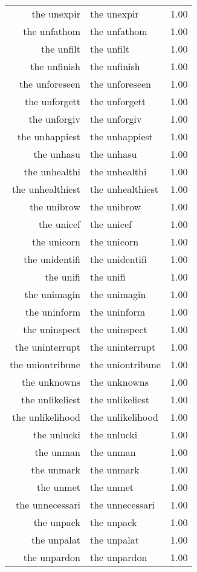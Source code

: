 \begin{table}[ht]
\begin{tabular}{rlr}
  the unexpir & the unexpir & 1.00 \\ 
  the unfathom & the unfathom & 1.00 \\ 
  the unfilt & the unfilt & 1.00 \\ 
  the unfinish & the unfinish & 1.00 \\ 
  the unforeseen & the unforeseen & 1.00 \\ 
  the unforgett & the unforgett & 1.00 \\ 
  the unforgiv & the unforgiv & 1.00 \\ 
  the unhappiest & the unhappiest & 1.00 \\ 
  the unhasu & the unhasu & 1.00 \\ 
  the unhealthi & the unhealthi & 1.00 \\ 
  the unhealthiest & the unhealthiest & 1.00 \\ 
  the unibrow & the unibrow & 1.00 \\ 
  the unicef & the unicef & 1.00 \\ 
  the unicorn & the unicorn & 1.00 \\ 
  the unidentifi & the unidentifi & 1.00 \\ 
  the unifi & the unifi & 1.00 \\ 
  the unimagin & the unimagin & 1.00 \\ 
  the uninform & the uninform & 1.00 \\ 
  the uninspect & the uninspect & 1.00 \\ 
  the uninterrupt & the uninterrupt & 1.00 \\ 
  the uniontribune & the uniontribune & 1.00 \\ 
  the unknowns & the unknowns & 1.00 \\ 
  the unlikeliest & the unlikeliest & 1.00 \\ 
  the unlikelihood & the unlikelihood & 1.00 \\ 
  the unlucki & the unlucki & 1.00 \\ 
  the unman & the unman & 1.00 \\ 
  the unmark & the unmark & 1.00 \\ 
  the unmet & the unmet & 1.00 \\ 
  the unnecessari & the unnecessari & 1.00 \\ 
  the unpack & the unpack & 1.00 \\ 
  the unpalat & the unpalat & 1.00 \\ 
  the unpardon & the unpardon & 1.00 \\ 

\end{tabular}
\end{table}
